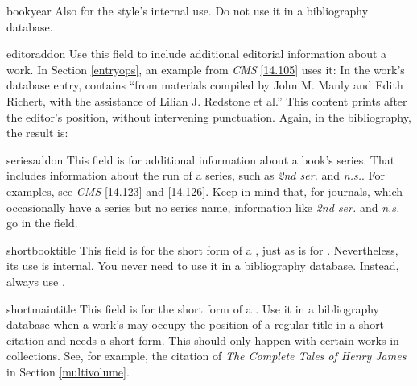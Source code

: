 \documentclass[11pt,letterpaper,oneside]{article}
\begin{document}
\begin{marglist}


\item[bookyear] Also for the style's internal use. Do not use it in a
bibliography database.

\item[editoraddon] Use this field to include additional editorial
information about a work. In Section \ref{entryops}, an example from
\textit{CMS} \ref{14.105} uses it: In the work's database entry,
 contains ``from materials compiled by John M.
Manly and Edith Richert, with the assistance of Lilian J. Redstone et
al.'' This content prints after the editor's position, without
intervening punctuation. Again, in the bibliography, the result is:

\begin{bibonly}
\nocite{chaucer1966}
\end{bibonly}

\item[seriesaddon] This field is for additional information about a
book's series. That includes information about the run of a series,
such as \textit{2nd ser.} and \textit{n.s.}. For examples, see
\textit{CMS} \ref{14.123} and \ref{14.126}. Keep in mind that, for
journals, which occasionally have a series but no series name,
information like \textit{2nd ser.} and \textit{n.s.} go in the
 field.

\item[shortbooktitle] This field is for the short form of a
, just as  is for
. Nevertheless, its use is internal. You never need to
use it in a bibliography database. Instead, always use
.

\item[shortmaintitle] This field is for the short form of a
. Use it in a bibliography database when a work's
 may occupy the position of a regular title in a
short citation and needs a short form. This should only happen with
certain works in collections. See, for example, the citation of
\textit{The Complete Tales of Henry James} in Section
\ref{multivolume}.

\end{marglist}
\end{document}
